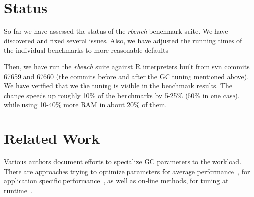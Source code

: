 \documentclass[12pt]{article}
\begin{document}
\section{Status}

So far we have assessed the status of the \emph{rbench} benchmark suite.
We have discovered and fixed several issues.
Also, we have adjusted the running times of the individual benchmarks to more reasonable defaults.

Then, we have run the \emph{rbench} suite against R interpreters built from svn commits 67659 and 67660 (the commits before and after the GC tuning mentioned above).
We have verified that we the tuning is visible in the benchmark results.
The change speeds up roughly 10\% of the benchmarks by 5-25\% (50\% in one case), while using 10-40\% more RAM in about 20\% of them. 

\section{Related Work}

Various authors document efforts to specialize GC parameters to the workload.
There are approaches trying to optimize parameters for average performance~\cite{Brecht06}, for application specific performance~\cite{Lengauer14,Singer07}, as well as on-line methods, for tuning at runtime~\cite{Cheng98,singer01}.

\clearpage


\end{document}
